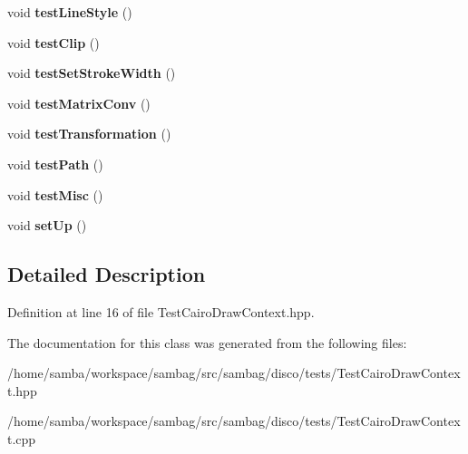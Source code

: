 \begin{DoxyCompactItemize}
\item 
\hypertarget{classtests_1_1_test_cairo_draw_context_a1ad3d9f245651d2bb579e1fd29653b2b}{
void {\bfseries testLineStyle} ()}
\label{classtests_1_1_test_cairo_draw_context_a1ad3d9f245651d2bb579e1fd29653b2b}

\item 
\hypertarget{classtests_1_1_test_cairo_draw_context_a812e9d071824b1a681fc83ac694a0337}{
void {\bfseries testClip} ()}
\label{classtests_1_1_test_cairo_draw_context_a812e9d071824b1a681fc83ac694a0337}

\item 
\hypertarget{classtests_1_1_test_cairo_draw_context_a33175a3a9bb8fae87364ae68924bf3f5}{
void {\bfseries testSetStrokeWidth} ()}
\label{classtests_1_1_test_cairo_draw_context_a33175a3a9bb8fae87364ae68924bf3f5}

\item 
\hypertarget{classtests_1_1_test_cairo_draw_context_ac08572b7697cb6afc27e7e589c033b97}{
void {\bfseries testMatrixConv} ()}
\label{classtests_1_1_test_cairo_draw_context_ac08572b7697cb6afc27e7e589c033b97}

\item 
\hypertarget{classtests_1_1_test_cairo_draw_context_a3d54d5283f20ea353a192d965fddc7c9}{
void {\bfseries testTransformation} ()}
\label{classtests_1_1_test_cairo_draw_context_a3d54d5283f20ea353a192d965fddc7c9}

\item 
\hypertarget{classtests_1_1_test_cairo_draw_context_a0a0fb602448b2d5213429b9cc26dfaa3}{
void {\bfseries testPath} ()}
\label{classtests_1_1_test_cairo_draw_context_a0a0fb602448b2d5213429b9cc26dfaa3}

\item 
\hypertarget{classtests_1_1_test_cairo_draw_context_a70099dc058a04ede94590d5304ba33bf}{
void {\bfseries testMisc} ()}
\label{classtests_1_1_test_cairo_draw_context_a70099dc058a04ede94590d5304ba33bf}

\item 
\hypertarget{classtests_1_1_test_cairo_draw_context_ad44a8a0837f344ba8a33712c3bb04af6}{
void {\bfseries setUp} ()}
\label{classtests_1_1_test_cairo_draw_context_ad44a8a0837f344ba8a33712c3bb04af6}

\end{DoxyCompactItemize}


\subsection{Detailed Description}


Definition at line 16 of file TestCairoDrawContext.hpp.



The documentation for this class was generated from the following files:\begin{DoxyCompactItemize}
\item 
/home/samba/workspace/sambag/src/sambag/disco/tests/TestCairoDrawContext.hpp\item 
/home/samba/workspace/sambag/src/sambag/disco/tests/TestCairoDrawContext.cpp\end{DoxyCompactItemize}
